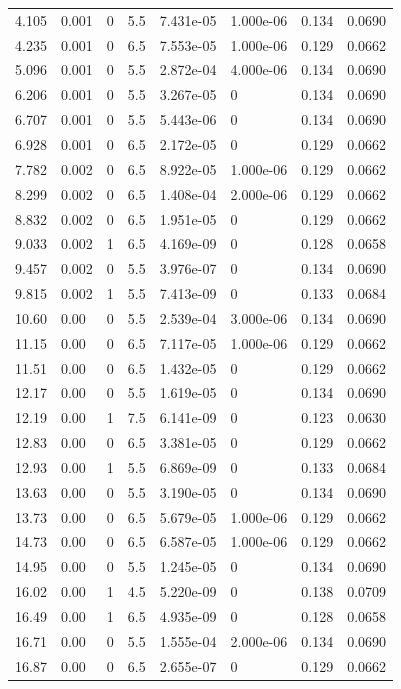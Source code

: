 \documentclass[preview]{standalone}
\begin{document}
{{\begin{tabular}{L{1.2cm}C{1.2cm} C{0.3cm}C{0.5cm} C{1.4cm}C{1.4cm} C{1.4cm}C{1.4cm}}
  4.105  &  0.001  & 0     & 5.5 &  7.431e-05  & 1.000e-06  & 0.134 &  0.0690   \\ 
  4.235  &  0.001  & 0     & 6.5 &  7.553e-05  & 1.000e-06  & 0.129 &  0.0662   \\ 
  5.096  &  0.001  & 0     & 5.5 &  2.872e-04  & 4.000e-06  & 0.134 &  0.0690   \\ 
  6.206  &  0.001  & 0     & 5.5 &  3.267e-05  & 0  & 0.134 &  0.0690   \\ 
  6.707  &  0.001  & 0     & 5.5 &  5.443e-06  & 0  & 0.134 &  0.0690   \\ 
  6.928  &  0.001  & 0     & 6.5 &  2.172e-05  & 0  & 0.129 &  0.0662   \\ 
  7.782  &  0.002  & 0     & 6.5 &  8.922e-05  & 1.000e-06  & 0.129 &  0.0662   \\ 
  8.299  &  0.002  & 0     & 6.5 &  1.408e-04  & 2.000e-06  & 0.129 &  0.0662   \\ 
  8.832  &  0.002  & 0     & 6.5 &  1.951e-05  & 0  & 0.129 &  0.0662   \\ 
  9.033  &  0.002  & 1     & 6.5 &  4.169e-09  & 0  & 0.128 &  0.0658   \\ 
  9.457  &  0.002  & 0     & 5.5 &  3.976e-07  & 0  & 0.134 &  0.0690   \\ 
  9.815  &  0.002  & 1     & 5.5 &  7.413e-09  & 0  & 0.133 &  0.0684   \\ 
  10.60  &  0.00  & 0     & 5.5 &  2.539e-04  & 3.000e-06  & 0.134 &  0.0690   \\ 
  11.15  &  0.00  & 0     & 6.5 &  7.117e-05  & 1.000e-06  & 0.129 &  0.0662   \\ 
  11.51  &  0.00  & 0     & 6.5 &  1.432e-05  & 0  & 0.129 &  0.0662   \\ 
  12.17  &  0.00  & 0     & 5.5 &  1.619e-05  & 0  & 0.134 &  0.0690   \\ 
  12.19  &  0.00  & 1     & 7.5 &  6.141e-09  & 0  & 0.123 &  0.0630   \\ 
  12.83  &  0.00  & 0     & 6.5 &  3.381e-05  & 0  & 0.129 &  0.0662   \\ 
  12.93  &  0.00  & 1     & 5.5 &  6.869e-09  & 0  & 0.133 &  0.0684   \\ 
  13.63  &  0.00  & 0     & 5.5 &  3.190e-05  & 0  & 0.134 &  0.0690   \\ 
  13.73  &  0.00  & 0     & 6.5 &  5.679e-05  & 1.000e-06  & 0.129 &  0.0662   \\ 
  14.73  &  0.00  & 0     & 6.5 &  6.587e-05  & 1.000e-06  & 0.129 &  0.0662   \\ 
  14.95  &  0.00  & 0     & 5.5 &  1.245e-05  & 0  & 0.134 &  0.0690   \\ 
  16.02  &  0.00  & 1     & 4.5 &  5.220e-09  & 0  & 0.138 &  0.0709   \\ 
  16.49  &  0.00  & 1     & 6.5 &  4.935e-09  & 0  & 0.128 &  0.0658   \\ 
  16.71  &  0.00  & 0     & 5.5 &  1.555e-04  & 2.000e-06  & 0.134 &  0.0690   \\ 
  16.87  &  0.00  & 0     & 6.5 &  2.655e-07  & 0  & 0.129 &  0.0662   \\ 
\hline 
\end{tabular} 

}}
\end{document}
